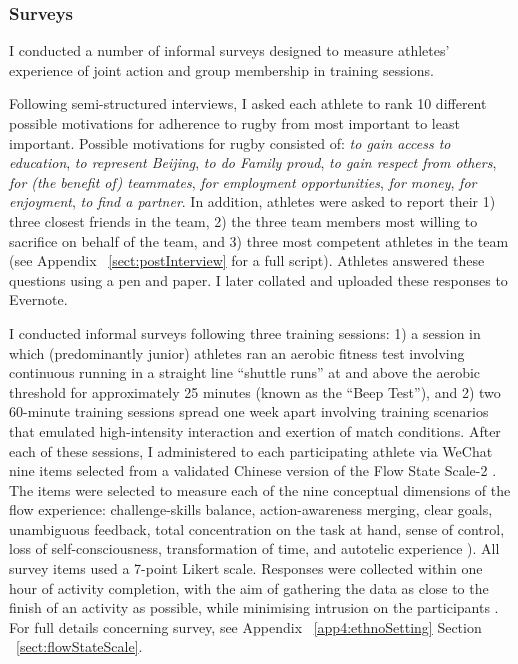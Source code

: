 \begin{CJK}{UTF8}{gbsn}

\subsubsection{Surveys\label{sect:procSurveys}}

 I conducted a number of informal surveys designed to measure athletes' experience of joint action and group membership in training sessions.

   Following semi-structured interviews, I asked each athlete to rank 10 different possible motivations for adherence to rugby from most important to least important. Possible motivations for rugby consisted of: \textit{to gain access to education}, \textit{to represent Beijing}, \textit{to do Family proud}, \textit{to gain respect from others}, \textit{for (the benefit of) teammates}, \textit{for employment opportunities}, \textit{for money}, \textit{for enjoyment}, \textit{to find a partner}. In addition, athletes were asked to report their 1) three closest friends in the team, 2) the three team members most willing to sacrifice on behalf of the team, and 3) three most competent athletes in the team (see Appendix ~\ref{sect:postInterview} for a full script). Athletes answered these questions using a pen and paper. I later collated and uploaded these responses to Evernote.

    I conducted informal surveys following three training sessions: 1) a session in which (predominantly junior) athletes ran an aerobic fitness test involving continuous running in a straight line ``shuttle runs''  at and above the aerobic threshold for approximately 25 minutes (known as the ``Beep Test''), and 2) two 60-minute training sessions spread one week apart involving training scenarios that emulated high-intensity interaction and exertion of match conditions.  After each of these sessions, I administered to each participating athlete via WeChat nine items selected from a validated Chinese version \citep{Liu2012} of the Flow State Scale-2 \citep{Jackson2002}.  The items were selected to measure each of the nine conceptual dimensions of the flow experience: challenge-skills balance, action-awareness merging, clear goals, unambiguous feedback, total concentration on the task at hand, sense of control, loss of self-consciousness, transformation of time, and autotelic experience \citep{Csikszentmihalyi1990}).  All survey items used a 7-point Likert scale.  Responses were collected within one hour of activity completion, with the aim of gathering the data as close to the finish of an activity as possible, while minimising intrusion on the participants \citep{Jackson2004}. For full details concerning survey, see Appendix ~\ref{app4:ethnoSetting} Section ~\ref{sect:flowStateScale}.



\end{CJK}
